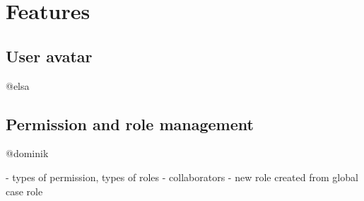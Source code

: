 \chapter{Features}\label{chap:features}





\section{User avatar}
@elsa





\section{Permission and role management}
@dominik

- types of permission, types of roles
- collaborators
- new role created from global case role


